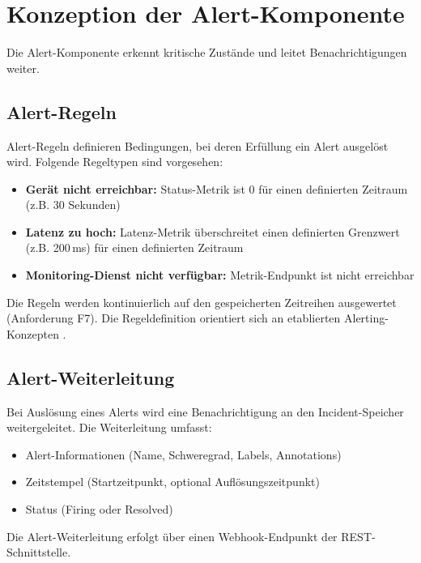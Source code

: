 \section{Konzeption der Alert-Komponente}
\label{sec:konzeption-alert}

Die Alert-Komponente erkennt kritische Zustände und leitet Benachrichtigungen weiter.

\subsection{Alert-Regeln}
\label{subsec:alert-regeln}

Alert-Regeln definieren Bedingungen, bei deren Erfüllung ein Alert ausgelöst wird. Folgende Regeltypen sind vorgesehen:

\begin{itemize}
    \item \textbf{Gerät nicht erreichbar:} Status-Metrik ist 0 für einen definierten Zeitraum (z.B. 30 Sekunden)
    \item \textbf{Latenz zu hoch:} Latenz-Metrik überschreitet einen definierten Grenzwert (z.B. 200\,ms) für einen definierten Zeitraum
    \item \textbf{Monitoring-Dienst nicht verfügbar:} Metrik-Endpunkt ist nicht erreichbar
\end{itemize}

Die Regeln werden kontinuierlich auf den gespeicherten Zeitreihen ausgewertet (Anforderung F7). Die Regeldefinition orientiert sich an etablierten Alerting-Konzepten \cite{alerting-best-practices}.

\subsection{Alert-Weiterleitung}
\label{subsec:alert-weiterleitung}

Bei Auslösung eines Alerts wird eine Benachrichtigung an den Incident-Speicher weitergeleitet. Die Weiterleitung umfasst:

\begin{itemize}
    \item Alert-Informationen (Name, Schweregrad, Labels, Annotations)
    \item Zeitstempel (Startzeitpunkt, optional Auflösungszeitpunkt)
    \item Status (Firing oder Resolved)
\end{itemize}

Die Alert-Weiterleitung erfolgt über einen Webhook-Endpunkt der REST-Schnittstelle.

